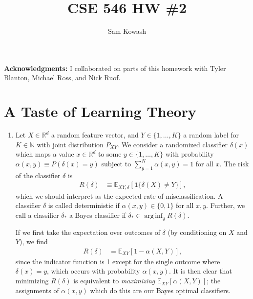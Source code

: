 \documentclass[11pt,letterpaper]{article}
\author{Sam Kowash}
\title{CSE 546 HW \#2}
\DeclareMathOperator*{\arginf}{arg\,inf}
\numberwithin{equation}{section}
\numberwithin{figure}{section}
\begin{document}
\maketitle

{\bf Acknowledgments:} I collaborated on parts of this homework with Tyler Blanton, Michael Ross, and Nick Ruof.

\section{A Taste of Learning Theory}
\begin{enumerate}
	\item Let $X \in \mathbb{R}^d$ a random feature vector, and $Y \in \{1,\ldots,K\}$ a random label for $K\in \mathbb{N}$ with joint distribution $P_{XY}$. We consider a randomized classifier $\delta(x)$ which maps a value $x\in\mathbb{R}^d$ to some $y \in \{1,\ldots,K\}$ with probability $\alpha(x,y) \equiv P(\delta(x)=y)$ subject to $\sum_{y=1}^K \alpha(x,y) = 1$ for all $x$. The risk of the classifier $\delta$ is
	\begin{align*}
		R(\delta) &\equiv \mathbb{E}_{XY,\delta}\left[\bm{1}\{\delta(X) \neq Y\}\right],
	\end{align*}
	which we should interpret as the expected rate of misclassification. A classifier $\delta$ is called deterministic if $\alpha(x,y) \in \{0,1\}$ for all $x,y$. Further, we call a classifier $\delta_\ast$ a Bayes classifier if $\delta_\ast \in \arginf_\delta R(\delta)$.

	If we first take the expectation over outcomes of $\delta$ (by conditioning on $X$ and $Y$), we find
	\begin{align*}
		R(\delta) &= \mathbb{E}_{XY}\left[1-\alpha(X,Y)\right],
	\end{align*}
	since the indicator function is 1 except for the single outcome where $\delta(x)=y$, which occurs with probability $\alpha(x,y)$. It is then clear that minimizing $R(\delta)$ is equivalent to \emph{maximizing} $\mathbb{E}_{XY}[\alpha(X,Y)]$; the assignments of $\alpha(x,y)$ which do this are our Bayes optimal classifiers.


\end{enumerate}
\end{document}
